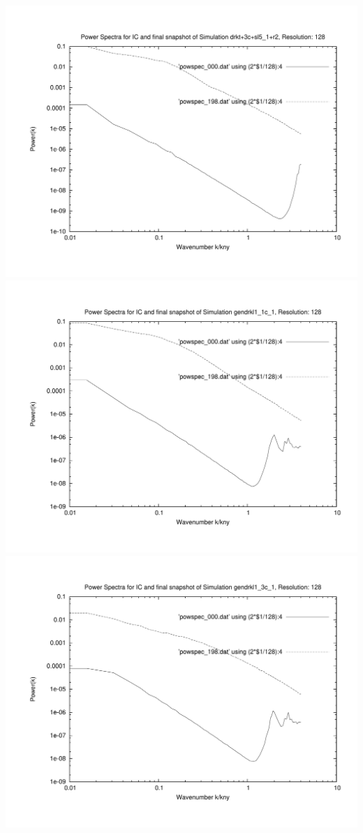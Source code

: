 \newpage

\includegraphics[scale=0.5]{r128/drkt+3c+sl5_1+r2/plot_powspec_drkt+3c+sl5_1+r2.pdf} \\
\includegraphics[scale=0.5]{r128/gendrkl1_1c_1/plot_powspec_gendrkl1_1c_1.pdf} \\
\includegraphics[scale=0.5]{r128/gendrkl1_3c_1/plot_powspec_gendrkl1_3c_1.pdf}